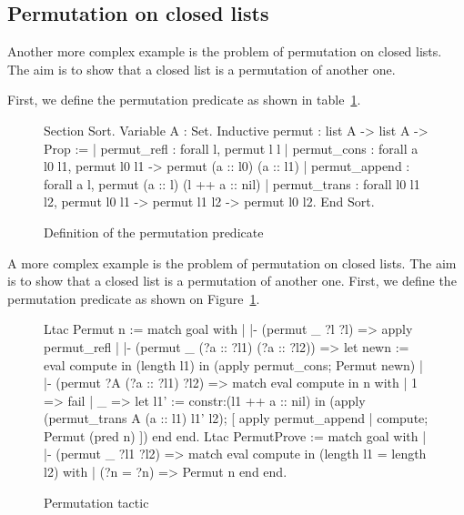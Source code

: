 \subsection{Permutation on closed lists}

Another more complex example is the problem of permutation on closed lists. The
aim is to show that a closed list is a permutation of another one.

First, we define the permutation predicate as shown in table~\ref{permutpred}.

\begin{figure}
\begin{centerframe}
\begin{coq_example*}
Section Sort.
Variable A : Set.
Inductive permut : list A -> list A -> Prop :=
  | permut_refl   : forall l, permut l l
  | permut_cons   :
      forall a l0 l1, permut l0 l1 -> permut (a :: l0) (a :: l1)
  | permut_append : forall a l, permut (a :: l) (l ++ a :: nil)
  | permut_trans  :
      forall l0 l1 l2, permut l0 l1 -> permut l1 l2 -> permut l0 l2.
End Sort.
\end{coq_example*}
\end{centerframe}
\caption{Definition of the permutation predicate}
\label{permutpred}
\end{figure}

A more complex example is the problem of permutation on closed lists.
The aim is to show that a closed list is a permutation of another one.
First, we define the permutation predicate as shown on
Figure~\ref{permutpred}.

\begin{figure}
\begin{centerframe}
\begin{coq_example}
Ltac Permut n :=
  match goal with
  | |- (permut _ ?l ?l) => apply permut_refl
  | |- (permut _ (?a :: ?l1) (?a :: ?l2)) =>
      let newn := eval compute in (length l1) in
      (apply permut_cons; Permut newn)
  | |- (permut ?A (?a :: ?l1) ?l2) =>
      match eval compute in n with
      | 1 => fail
      | _ =>
          let l1' := constr:(l1 ++ a :: nil) in
          (apply (permut_trans A (a :: l1) l1' l2);
            [ apply permut_append | compute; Permut (pred n) ])
      end
  end.
Ltac PermutProve :=
  match goal with
  | |- (permut _ ?l1 ?l2) =>
      match eval compute in (length l1 = length l2) with
      | (?n = ?n) => Permut n
      end
  end.
\end{coq_example}
\end{centerframe}
\caption{Permutation tactic}
\label{permutltac}
\end{figure}


